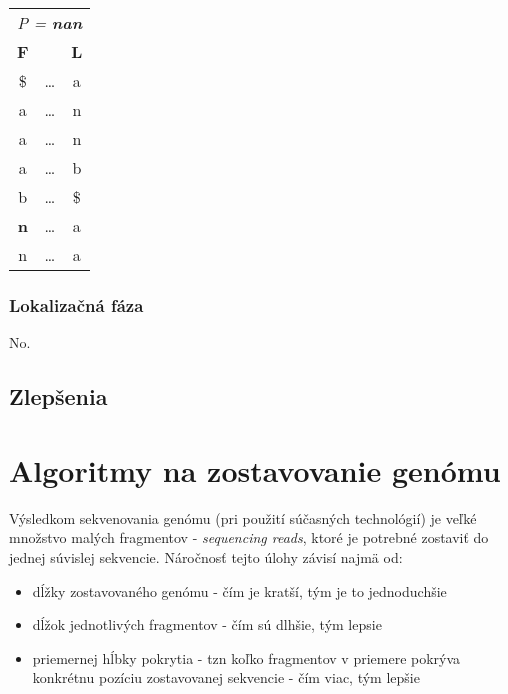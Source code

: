 \begin{example}
\begin{minipage}{2in}
\begin{tabular}{ c c c }
                \multicolumn{3}{c}{\emph{P = \textbf{nan}}} \\
                \textbf{F} &        & \textbf{L} \\
                \$         & \ldots & a          \\            
                a          & \ldots & n          \\
                a          & \ldots & n          \\
                a          & \ldots & b          \\
                b          & \ldots & \$         \\
                \textbf{n} & \ldots & a          \\ 
                n          & \ldots & a          \\
            \end{tabular}
        \end{minipage}
    \end{example}
    \bigskip

    \subsubsection{Lokalizačná fáza}
    No.
    
    \subsection{Zlepšenia}
    
\section{Algoritmy na zostavovanie genómu}
    Výsledkom sekvenovania genómu (pri použití súčasných technológií) je veľké
    množstvo malých fragmentov - \emph{sequencing reads}, ktoré je potrebné
    zostaviť do jednej súvislej sekvencie. Náročnosť tejto úlohy závisí najmä
    od:
    
    \begin{itemize}
        \item dĺžky zostavovaného genómu - čím je kratší, tým je to jednoduchšie
        \item dĺžok jednotlivých fragmentov - čím sú dlhšie, tým lepsie
        \item priemernej hĺbky pokrytia - tzn koľko fragmentov v priemere
        pokrýva konkrétnu pozíciu zostavovanej sekvencie - čím viac, tým lepšie
    \end{itemize}

